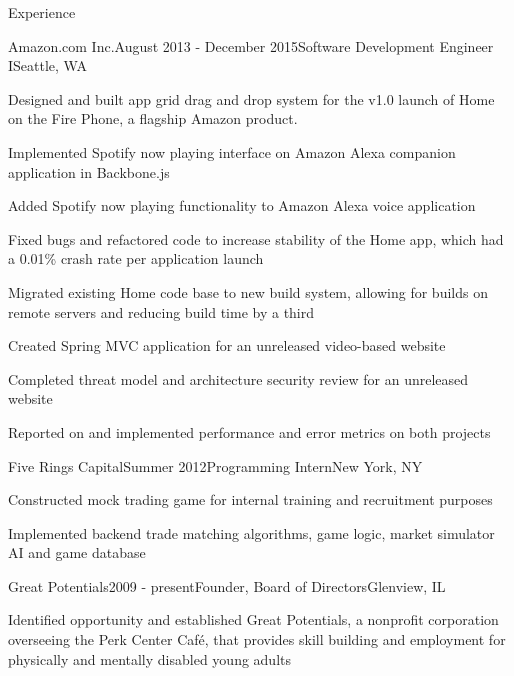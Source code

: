 \documentclass{resume} %
\begin{document}
\begin{rSection}{Experience}
\begin{rSubsection}{Amazon.com Inc.}{August 2013 - December 2015}{Software Development Engineer I}{Seattle, WA}
\item Designed and built app grid drag and drop system for the v1.0 launch of Home on the Fire Phone, a flagship Amazon product.
\item Implemented Spotify now playing interface on Amazon Alexa companion application in Backbone.js
\item Added Spotify now playing functionality to Amazon Alexa voice application
\item Fixed bugs and refactored code to increase stability of the Home app, which had a 0.01\% crash rate per application launch
\item Migrated existing Home code base to new build system, allowing for builds on remote servers and reducing build time by a third
\item Created Spring MVC application for an unreleased video-based website
\item Completed threat model and architecture security review for an unreleased website
\item Reported on and implemented performance and error metrics on both projects
\end{rSubsection}


\begin{rSubsection}{Five Rings Capital}{Summer 2012}{Programming Intern}{New York, NY}
\item Constructed mock trading game for internal training and recruitment purposes
\item Implemented backend trade matching algorithms, game logic, market simulator AI and game database
\end{rSubsection}


\begin{rSubsection}{Great Potentials}{2009 - present}{Founder, Board of Directors}{Glenview, IL}
\item Identified opportunity and established Great Potentials, a nonprofit corporation overseeing the Perk Center Caf\'{e}, that provides skill building and employment for physically and mentally disabled young adults
\end{rSubsection}


\end{rSection}
\end{document}
